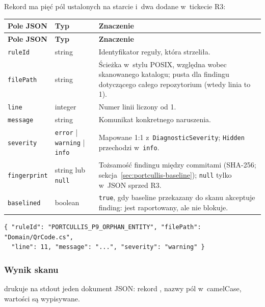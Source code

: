 Rekord  ma pięć pól ustalonych na starcie
i~dwa dodane w~tickecie R3:

\begin{xltabular}{\linewidth}{@{}>{\raggedright\arraybackslash}p{2.4cm} >{\raggedright\arraybackslash}p{2.6cm} >{\raggedright\arraybackslash}X@{}}
\toprule
\textbf{Pole JSON} & \textbf{Typ} & \textbf{Znaczenie} \\
\midrule
\endfirsthead
\toprule
\textbf{Pole JSON} & \textbf{Typ} & \textbf{Znaczenie} \\
\midrule
\endhead
\texttt{ruleId} & string & Identyfikator reguły, która strzeliła. \\
\texttt{filePath} & string & Ścieżka w~stylu POSIX, względna wobec skanowanego katalogu; pusta dla findingu dotyczącego całego repozytorium (wtedy linia to 1). \\
\texttt{line} & integer & Numer linii liczony od 1. \\
\texttt{message} & string & Komunikat konkretnego naruszenia. \\
\texttt{severity} & \texttt{error} | \texttt{warning} | \texttt{info} & Mapowane 1:1 z~\texttt{DiagnosticSeverity}; \texttt{Hidden} przechodzi w~\texttt{info}. \\
\texttt{fingerprint} & string lub \texttt{null} & Tożsamość findingu między commitami (SHA-256; sekcja~\ref{sec:portcullis-baseline}); \texttt{null} tylko w~JSON sprzed R3. \\
\texttt{baselined} & boolean & \texttt{true}, gdy baseline przekazany do skanu akceptuje finding: jest raportowany, ale nie blokuje. \\
\bottomrule
\end{xltabular}

\begin{lstlisting}
{ "ruleId": "PORTCULLIS_P9_ORPHAN_ENTITY", "filePath": "Domain/QrCode.cs",
  "line": 11, "message": "...", "severity": "warning" }
\end{lstlisting}

\subsubsection{Wynik skanu}

 drukuje na stdout jeden dokument JSON: rekord
, nazwy pól w~camelCase, wartości 
są wypisywane.

